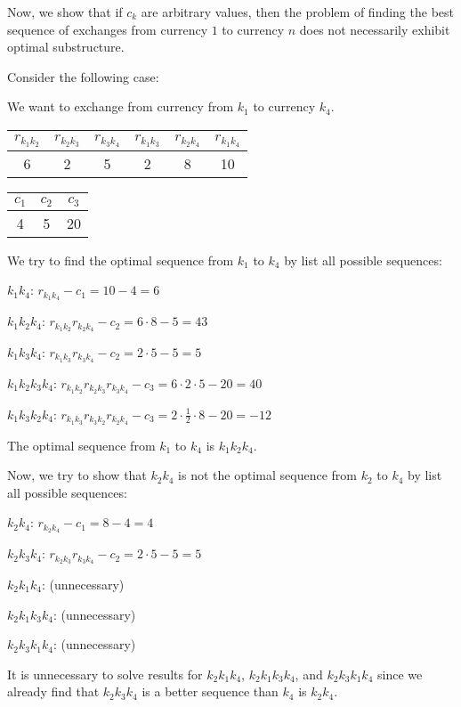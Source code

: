 \noindent
Now, we show that if $c_k$ are arbitrary values, 
then the problem of finding the best sequence of exchanges 
from currency $1$ to currency $n$ does not
necessarily exhibit optimal substructure.

\noindent
Consider the following case:

\noindent
We want to exchange from currency from $k_1$ to currency $k_4$.

\begin{tabular}{c|c|c|c|c|c}
    $r_{k_1k_2}$ & $r_{k_2k_3}$ & $r_{k_3k_4}$
    & $r_{k_1k_3}$ & $r_{k_2k_4}$ & $r_{k_1k_4}$ \\
    \hline
    6 & 2 & 5 & 2 & 8 & 10
\end{tabular}
\indent\indent\indent
\begin{tabular}{c|c|c}
    $c_1$ & $c_2$ & $c_3$ \\
    \hline
    4 & 5 & 20
\end{tabular}

\noindent
We try to find the optimal sequence from $k_1$ to $k_4$ 
by list all possible sequences:

$k_1k_4$: $r_{k_1k_4} - c_1 = 10 - 4 = 6$

$k_1k_2k_4$: $r_{k_1k_2}r_{k_2k_4} - c_2 = 6 \cdot 8 - 5 = 43$

$k_1k_3k_4$: $r_{k_1k_3}r_{k_3k_4} - c_2 = 2 \cdot 5 - 5 = 5$

$k_1k_2k_3k_4$: $r_{k_1k_2}r_{k_2k_3}r_{k_3k_4} - c_3 
= 6 \cdot 2 \cdot 5 - 20 = 40$

$k_1k_3k_2k_4$: $r_{k_1k_3}r_{k_3k_2}r_{k_2k_4} - c_3 
= 2 \cdot \frac{1}{2} \cdot 8 - 20 = -12$

\noindent
The optimal sequence from $k_1$ to $k_4$ is $k_1k_2k_4$.

\noindent
Now, we try to show that $k_2k_4$ is not the optimal sequence 
from $k_2$ to $k_4$ 
by list all possible sequences:

$k_2k_4$: $r_{k_2k_4} - c_1 = 8 - 4 = 4$

$k_2k_3k_4$: $r_{k_2k_3}r_{k_3k_4} - c_2 = 2 \cdot 5 - 5 = 5$

$k_2k_1k_4$: (unnecessary)

$k_2k_1k_3k_4$: (unnecessary)

$k_2k_3k_1k_4$: (unnecessary)

\noindent
It is unnecessary to solve results for 
$k_2k_1k_4$, $k_2k_1k_3k_4$, and $k_2k_3k_1k_4$ 
since we already find that 
$k_2k_3k_4$ is a better sequence than $k_4$ is $k_2k_4$.

